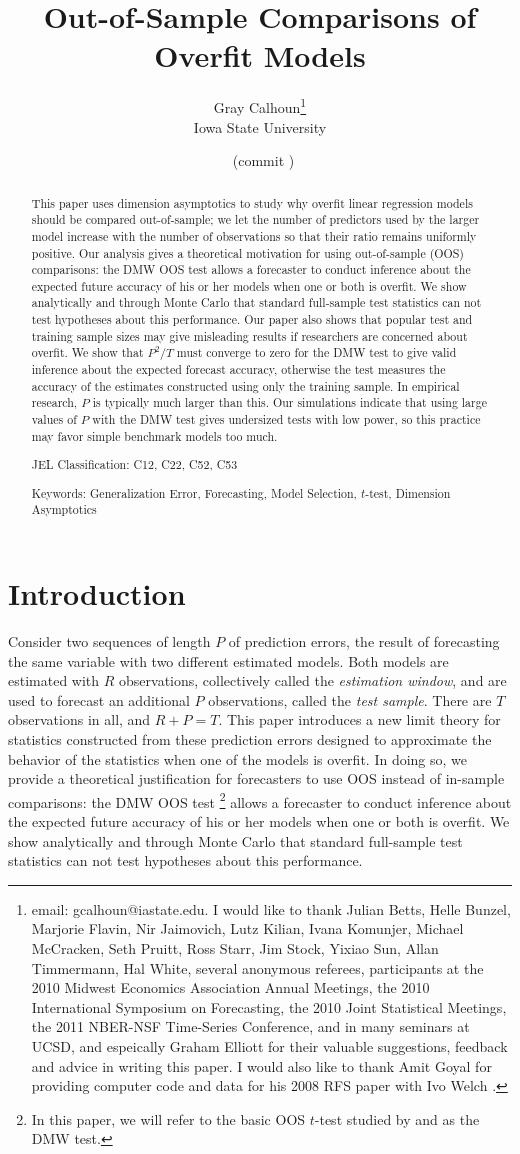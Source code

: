 \documentclass[11pt]{article}
\date{\dinfo\ (commit \hinfo)}
\title{Out-of-Sample Comparisons of Overfit Models}
\author{Gray Calhoun\thanks{email: gcalhoun@iastate.edu. I
    would like to thank Julian Betts, Helle Bunzel, Marjorie Flavin,
    Nir Jaimovich, Lutz Kilian, Ivana Komunjer, Michael McCracken,
    Seth Pruitt, Ross Starr, Jim Stock, Yixiao Sun, Allan Timmermann,
    Hal White, several anonymous referees, participants at the 2010
    Midwest Economics Association Annual Meetings, the 2010
    International Symposium on Forecasting, the 2010 Joint Statistical
    Meetings, the 2011 NBER-NSF Time-Series
    Conference, and in many seminars at UCSD, and espeically
    Graham Elliott for their valuable suggestions, feedback and advice
    in writing this paper.  I would also like to thank Amit Goyal for
    providing computer code and data for his 2008 RFS paper
    with Ivo Welch \citep{GoW:08}.} \\ Iowa State University}
\begin{document}
\maketitle

\begin{abstract}\thispagestyle{empty}\noindent
  This paper uses dimension asymptotics to study why overfit linear
  regression models should be compared out-of-sample; we let the
  number of predictors used by the larger model increase with the
  number of observations so that their ratio remains uniformly
  positive.  Our analysis gives a theoretical motivation for using
  out-of-sample (OOS) comparisons: the DMW OOS test allows a forecaster to
  conduct inference about the expected future accuracy of his or her
  models when one or both is overfit.  We show analytically and
  through Monte Carlo that standard full-sample test statistics can
  not test hypotheses about this performance.  Our paper also shows
  that popular test and training sample sizes may give misleading
  results if researchers are concerned about overfit.  We show that
  $P^2/T$ must converge to zero for the DMW test to give valid
  inference about the expected forecast accuracy, otherwise the test
  measures the accuracy of the estimates constructed using only the
  training sample.  In empirical research, $P$ is typically much
  larger than this.  Our simulations indicate that using large values
  of $P$ with the DMW test gives undersized tests with low power, so
  this practice may favor simple benchmark models too much.

\noindent JEL Classification: C12, C22, C52, C53

\noindent Keywords: Generalization Error, Forecasting, Model
Selection, $t$-test, Dimension Asymptotics
\end{abstract}
\newpage

\section{Introduction}\label{sec:introduction}
Consider two sequences of length $P$ of prediction errors, the result
of forecasting the same variable with two different estimated models.
Both models are estimated with $R$ observations, collectively called
the {\em estimation window}, and are used to forecast an additional
$P$ observations, called the {\em test sample}.  There are $T$
observations in all, and $R+P=T$.  This paper introduces a new limit
theory for statistics constructed from these prediction errors
designed to approximate the behavior of the statistics when one of the
models is overfit.  In doing so, we provide a theoretical
justification for forecasters to use OOS instead of in-sample
comparisons: the DMW OOS test%
\footnote{In this paper, we will refer to the basic OOS $t$-test
  studied by \citet{DiM:95} and \citet{Wes:96} as the DMW test.} %
allows a forecaster to conduct
inference about the expected future accuracy of his or her models when
one or both is overfit.  We show analytically and through Monte Carlo
that standard full-sample test statistics can not test hypotheses
about this performance.
\end{document}
